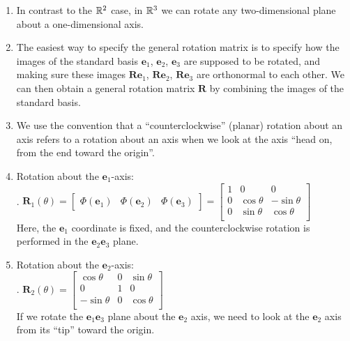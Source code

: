 \begin{enumerate}
    \item In contrast to the $\mathbb{R}^2$ case, in $\mathbb{R}^3$ we can rotate any two-dimensional plane about a one-dimensional axis.
    \hfill \cite{mfml/book/mml/Deisenroth-Faisal-Ong}

    \item The easiest way to specify the general rotation matrix is to specify how the images of the standard basis $\bm{e}_1$, $\bm{e}_2$, $\bm{e}_3$ are supposed to be rotated, and making sure these images $\bm{Re}_1$, $\bm{Re}_2$, $\bm{Re}_3$ are orthonormal to each other.
    We can then obtain a general rotation matrix $\bm{R}$ by combining the images of the standard basis.
    \hfill \cite{mfml/book/mml/Deisenroth-Faisal-Ong}

    \item We use the convention that a “counterclockwise” (planar) rotation about an axis refers to a rotation about an axis when we look at the axis “head on, from the end toward the origin”.
    \hfill \cite{mfml/book/mml/Deisenroth-Faisal-Ong}



    \item Rotation about the $\bm{e}_1$-axis:
    \hfill \cite{mfml/book/mml/Deisenroth-Faisal-Ong}
    \\
    .\hfill
    $
        \bm{R}_1(\theta)
        = \begin{bmatrix}\Phi(\bm{e}_1) & \Phi(\bm{e}_2) & \Phi(\bm{e}_3)\end{bmatrix}
        = \begin{bmatrix}
        1 & 0 & 0 \\
        0 & \cos \theta & - \sin \theta \\
        0 & \sin \theta & \cos \theta \\
        \end{bmatrix}
    $
    \hfill \cite{mfml/book/mml/Deisenroth-Faisal-Ong}
    \\
    Here, the $\bm{e}_1$ coordinate is fixed, and the counterclockwise rotation is performed in the $\bm{e}_2\bm{e}_3$ plane.
    \hfill \cite{mfml/book/mml/Deisenroth-Faisal-Ong}



    \item Rotation about the $\bm{e}_2$-axis:
    \hfill \cite{mfml/book/mml/Deisenroth-Faisal-Ong}
    \\
    .\hfill
    $
        \bm{R}_2(\theta)
        = \begin{bmatrix}
        \cos \theta & 0 &  \sin \theta \\
        0 & 1 & 0 \\
        - \sin \theta & 0 & \cos \theta \\
        \end{bmatrix}
    $
    \hfill \cite{mfml/book/mml/Deisenroth-Faisal-Ong}
    \\
    If we rotate the $\bm{e}_1\bm{e}_3$ plane about the $\bm{e}_2$ axis, we need to look at the $\bm{e}_2$ axis from its “tip” toward the origin.
    \hfill \cite{mfml/book/mml/Deisenroth-Faisal-Ong}




\end{enumerate}
